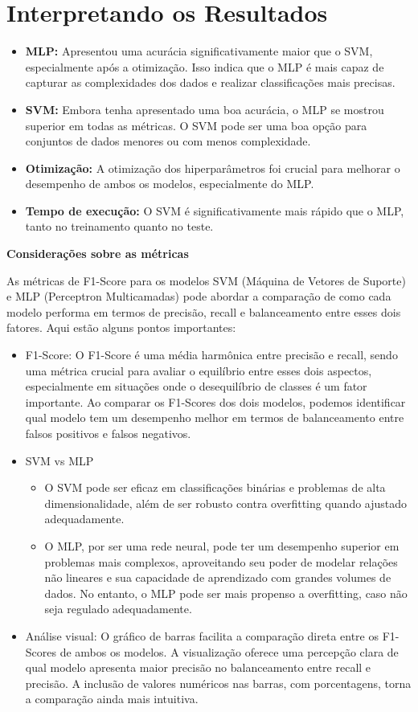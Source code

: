 \documentclass[12pt,a4paper,oneside,openany]{article}
\begin{document}
\section{Interpretando os Resultados}
\begin{itemize}
    \item \textbf{MLP:} Apresentou uma acurácia significativamente maior que o SVM, especialmente após a otimização. Isso indica que o MLP é mais capaz de capturar as complexidades dos dados e realizar classificações mais precisas.
    \item \textbf{SVM:} Embora tenha apresentado uma boa acurácia, o MLP se mostrou superior em todas as métricas. O SVM pode ser uma boa opção para conjuntos de dados menores ou com menos complexidade.
    \item \textbf{Otimização:} A otimização dos hiperparâmetros foi crucial para melhorar o desempenho de ambos os modelos, especialmente do MLP.
    \item \textbf{Tempo de execução:} O SVM é significativamente mais rápido que o MLP, tanto no treinamento quanto no teste.
\end{itemize}
\noindent
\textbf{Considerações sobre as métricas}

\noindent As métricas de F1-Score para os modelos SVM (Máquina de Vetores de Suporte) e MLP (Perceptron Multicamadas) pode abordar a comparação de como cada modelo performa em termos de precisão, recall e balanceamento entre esses dois fatores. Aqui estão alguns pontos importantes:

\begin{itemize}
    \item F1-Score: O F1-Score é uma média harmônica entre precisão e recall, sendo uma métrica crucial para avaliar o equilíbrio entre esses dois aspectos, especialmente em situações onde o desequilíbrio de classes é um fator importante. Ao comparar os F1-Scores dos dois modelos, podemos identificar qual modelo tem um desempenho melhor em termos de balanceamento entre falsos positivos e falsos negativos.
    \item SVM vs MLP
    \begin{itemize}
    \item O SVM pode ser eficaz em classificações binárias e problemas de alta dimensionalidade, além de ser robusto contra overfitting quando ajustado adequadamente.
    \item O MLP, por ser uma rede neural, pode ter um desempenho superior em problemas mais complexos, aproveitando seu poder de modelar relações não lineares e sua capacidade de aprendizado com grandes volumes de dados. No entanto, o MLP pode ser mais propenso a overfitting, caso não seja regulado adequadamente.
\end{itemize}
    \item Análise visual: O gráfico de barras facilita a comparação direta entre os F1-Scores de ambos os modelos. A visualização oferece uma percepção clara de qual modelo apresenta maior precisão no balanceamento entre recall e precisão. A inclusão de valores numéricos nas barras, com porcentagens, torna a comparação ainda mais intuitiva.
\end{itemize}
\end{document}
